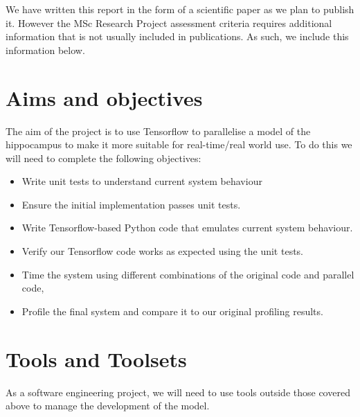 We have written this report in the form of a scientific paper as we plan to publish it. 
However the MSc Research Project assessment criteria requires additional information that is not usually included in publications.
As such, we include this information below.

\section{Aims and objectives}
The aim of the project is to use Tensorflow to parallelise a model of the hippocampus to make it more suitable for real-time/real world use. To do this we will need to complete the following objectives:
\begin{itemize}
    \item Write unit tests to understand current system behaviour
    \item Ensure the initial implementation passes unit tests.
    \item Write Tensorflow-based Python code that emulates current system behaviour.
    \item Verify our Tensorflow code works as expected using the unit tests.
    \item Time the system using different combinations of the original code and parallel code,
    \item Profile the final system and compare it to our original profiling results.
\end{itemize}

\section{Tools and Toolsets}
As a software engineering project, we will need to use tools outside those covered above to manage the development of the model.

